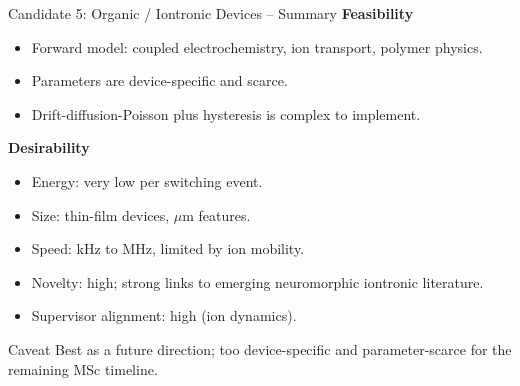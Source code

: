 \documentclass[aspectratio=169,11pt]{beamer}
\begin{document}
\begin{frame}{Candidate 5: Organic / Iontronic Devices -- Summary}
  \small
  \textbf{Feasibility}
  \begin{itemize}
    \item Forward model: coupled electrochemistry, ion transport, polymer physics.
    \item Parameters are device-specific and scarce.
    \item Drift-diffusion-Poisson plus hysteresis is complex to implement.
  \end{itemize}

  \vspace{0.1cm}
  \textbf{Desirability}
  \begin{itemize}
    \item Energy: very low per switching event.
    \item Size: thin-film devices, $\mu$m features.
    \item Speed: kHz to MHz, limited by ion mobility.
    \item Novelty: high; strong links to emerging neuromorphic iontronic literature.
    \item Supervisor alignment: high (ion dynamics).
  \end{itemize}

  \vspace{0.1cm}
  \begin{block}{Caveat}
    Best as a future direction; too device-specific and parameter-scarce for the remaining MSc timeline.
  \end{block}
\end{frame}
\end{document}
